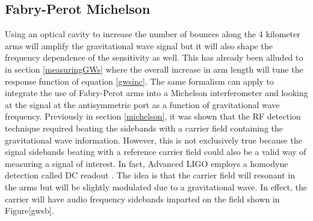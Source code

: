		\subsection{Fabry-Perot Michelson}\label{FPmich}
		Using an optical cavity to increase the number of bounces along the 4 kilometer arms will amplify the gravitational wave signal but it will also shape the frequency dependence of the sensitivity as well.  This has already been alluded to in section \ref{measuringGWs} where the overall increase in arm length will tune the response function of equation \ref{gwsinc}.  The same formalism can apply to integrate the use of Fabry-Perot arms into a Michelson interferometer and looking at the signal at the antisymmetric port as a function of gravitational wave frequency. Previously in section \ref{michelson}, it was shown that the RF detection technique required beating the sidebands with a carrier field containing the gravitational wave information.  However, this is not exclusively true because the signal sidebands beating with a reference carrier field could also be a valid way of measuring a signal of interest. In fact, Advanced LIGO employs a homodyne detection called DC readout \cite{FritschelReadout}\cite{FritschelAdvancedLIGO}. The idea is that the carrier field will resonant in the arms but will be slightly modulated due to a gravitational wave.  In effect, the carrier will have audio frequency sidebands imparted on the field shown in Figure[gwsb].  
		

